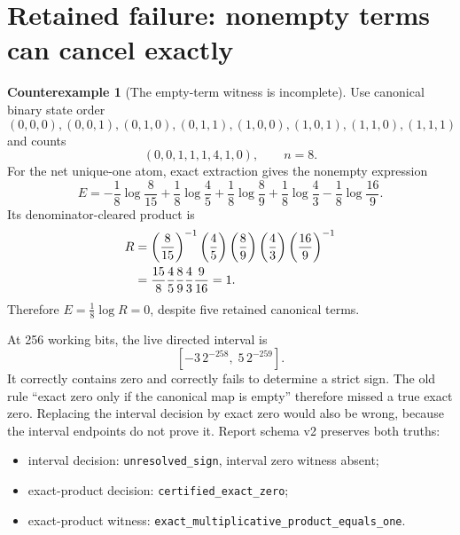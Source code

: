 \documentclass[11pt]{article}
\theoremstyle{definition}
\newtheorem{counterexample}[theorem]{Counterexample}
\begin{document}
\section{Retained failure: nonempty terms can cancel exactly}

\begin{counterexample}[The empty-term witness is incomplete]\label{cex:n8}
Use canonical binary state order
\[
(0,0,0),(0,0,1),(0,1,0),(0,1,1),(1,0,0),(1,0,1),(1,1,0),(1,1,1)
\]
and counts
\begin{equation}\label{eq:witness-counts}
(0,0,1,1,1,4,1,0),\qquad n=8.
\end{equation}
For the net unique-one atom, exact extraction gives the nonempty expression
\begin{equation}\label{eq:witness-expression}
E=-\frac18\log\frac8{15}
  +\frac18\log\frac45
  +\frac18\log\frac89
  +\frac18\log\frac43
  -\frac18\log\frac{16}{9}.
\end{equation}
Its denominator-cleared product is
\begin{align}
R&=\left(\frac8{15}\right)^{-1}
  \left(\frac45\right)
  \left(\frac89\right)
  \left(\frac43\right)
  \left(\frac{16}{9}\right)^{-1}\notag\\
 &=\frac{15}{8}\frac45\frac89\frac43\frac9{16}=1.\label{eq:witness-product}
\end{align}
Therefore \(E=\frac18\log R=0\), despite five retained canonical terms.
\end{counterexample}

At 256 working bits, the live directed interval is
\begin{equation}\label{eq:witness-interval}
[-3\,2^{-258},\;5\,2^{-259}].
\end{equation}
It correctly contains zero and correctly fails to determine a strict sign.  The old rule
``exact zero only if the canonical map is empty'' therefore missed a true exact zero.  Replacing
the interval decision by exact zero would also be wrong, because the interval endpoints do not
prove it.  Report schema v2 preserves both truths:
\begin{itemize}[leftmargin=*]
  \item interval decision: \texttt{unresolved\_sign}, interval zero witness absent;
  \item exact-product decision: \texttt{certified\_exact\_zero};
  \item exact-product witness: \texttt{exact\_multiplicative\_product\_equals\_one}.
\end{itemize}
\end{document}
